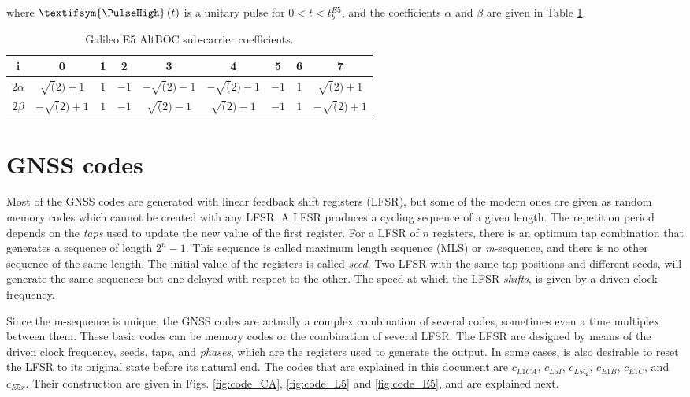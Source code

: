 \documentclass[openany,10pt,twoside,a4paper]{book}
\begin{document}
where $\textifsym{\PulseHigh} \left(t\right)$ is a unitary pulse for $0<t<t_{b}^{E5}$, and the coefficients $\alpha$ and $\beta$ are given in Table \ref{tab:coeff_altboc}.
\begin{table}[tb]
\centering
  \caption{Galileo E5 AltBOC sub-carrier coefficients.}
\begin{tabular}{|c|c|c|c|c|c|c|c|c|}
 \hline 
 \textbf{i} & \textbf{0} & \textbf{1} & \textbf{2} & \textbf{3} & \textbf{4} & \textbf{5} & \textbf{6} & \textbf{7} \\ 
 \hline 
 $2\alpha$ & $\sqrt(2)+1$ & $1$ & $-1$ & $-\sqrt(2)-1$ & $-\sqrt(2)-1$ & $-1$ & $1$ & $\sqrt(2)+1$ \\ 
 \hline 
 $2\beta$ & $-\sqrt(2)+1$ & $1$ & $-1$ & $\sqrt(2)-1$ & $\sqrt(2)-1$ & $-1$ & $1$ & $-\sqrt(2)+1$ \\ 
 \hline 
\end{tabular}  
\label{tab:coeff_altboc}%
\end{table}

\chapter{GNSS codes}
Most of the GNSS codes are generated with linear feedback shift registers (LFSR), but some of the modern ones are given as random memory codes which cannot be created with any LFSR. A LFSR produces a cycling sequence of a given length. The repetition period depends on the \textit{taps} used to update the new value of the first register. For a LFSR of $n$ registers, there is an optimum tap combination that generates a sequence of length $2^n-1$. This sequence is called maximum length sequence (MLS) or \textit{m}-sequence, and there is no other sequence of the same length. The initial value of the registers is called \textit{seed}. Two LFSR with the same tap positions and different seeds, will generate the same sequences but one delayed with respect to the other. The speed at which the LFSR \textit{shifts}, is given by a driven clock frequency.   

Since the m-sequence is unique, the GNSS codes are actually a complex combination of several codes, sometimes even a time multiplex between them. These basic codes can be memory codes or the combination of several LFSR. The LFSR are designed by means of the driven clock frequency, seeds, taps, and \textit{phases}, which are the registers used to generate the output. In some cases, is also desirable to reset the LFSR to its original state before its natural end. The codes that are explained in this document are $c_{L1CA}$, $c_{L5I}$, $c_{L5Q}$, $c_{E1B}$, $c_{E1C}$, and $c_{E5x}$. Their construction are given in Figs. \ref{fig:code_CA}, \ref{fig:code_L5} and \ref{fig:code_E5}, and are explained next.\newline
\end{document}
